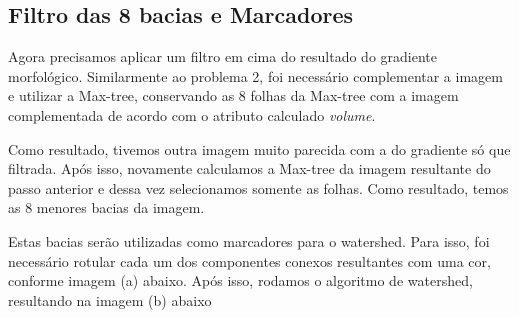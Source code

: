 \documentclass{article}
\begin{document}
	\subsection{Filtro das 8 bacias e Marcadores}	
		
	Agora precisamos aplicar um filtro em cima do resultado do gradiente morfológico. Similarmente ao problema 2, foi necessário complementar a imagem e utilizar a Max-tree, conservando as 8 folhas da Max-tree com a imagem complementada de acordo com o atributo calculado \textit{volume}. 
	
	Como resultado, tivemos outra imagem muito parecida com a do gradiente só que filtrada. Após isso, novamente calculamos a Max-tree da imagem resultante do passo anterior e dessa vez selecionamos somente as folhas. Como resultado, temos as 8 menores bacias da imagem.
	
	Estas bacias serão utilizadas como marcadores para o watershed. Para isso, foi necessário rotular cada um dos componentes conexos resultantes com uma cor, conforme imagem (a) abaixo. Após isso, rodamos o algoritmo de watershed, resultando na imagem (b) abaixo
	
\end{document}
